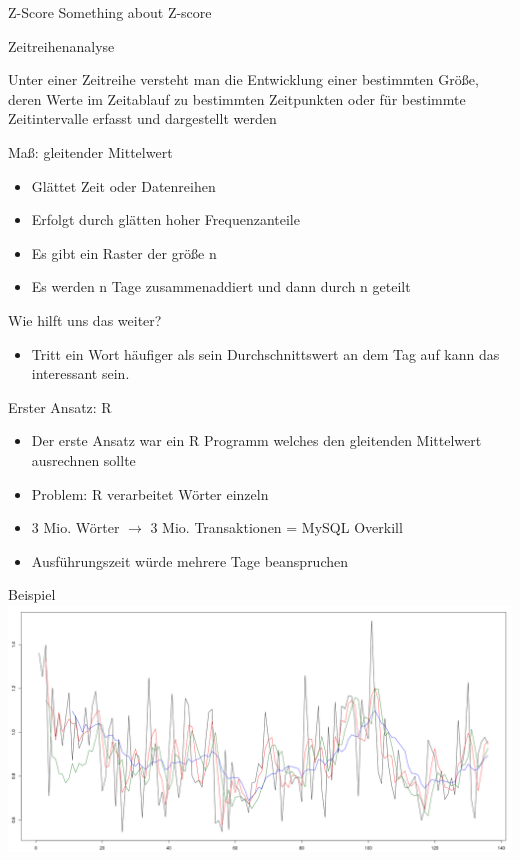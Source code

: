 \documentclass{beamer}
\begin{document}
\begin{frame}{Z-Score}
	Something about Z-score
\end{frame}

\begin{frame}{Zeitreihenanalyse}
 \begin{definition}[Zeitreihenanalyse]
 	Unter einer Zeitreihe
	versteht man die Entwicklung einer bestimmten Größe, deren Werte im Zeitablauf zu bestimmten Zeitpunkten oder für bestimmte Zeitintervalle erfasst und dargestellt
	werden
 \end{definition}
	
\end{frame}

\begin{frame}{Maß: gleitender Mittelwert}
	\begin{itemize}
		\item Glättet Zeit oder Datenreihen
		\item Erfolgt durch glätten hoher Frequenzanteile
		\item Es gibt ein Raster der größe n		
		\item Es werden n Tage zusammenaddiert und dann durch n geteilt
	\end{itemize}
	
	Wie hilft uns das weiter?
	
	\begin{itemize}
		\item Tritt ein Wort häufiger als sein Durchschnittswert an dem Tag auf kann das interessant sein.
	\end{itemize}		
	
\end{frame}

\begin{frame}{Erster Ansatz: R}
	\begin{itemize}
		\item Der erste Ansatz war ein R Programm welches den gleitenden Mittelwert ausrechnen sollte
		\item Problem: R verarbeitet Wörter einzeln 
		\item 3 Mio. Wörter $\rightarrow$ 3 Mio. Transaktionen = MySQL Overkill
		\item Ausführungszeit würde mehrere Tage beanspruchen
	\end{itemize}
\end{frame}

\begin{frame}{Beispiel}
\includegraphics[scale=0.18]{Bilder/R.png}
\end{frame}
\end{document}
